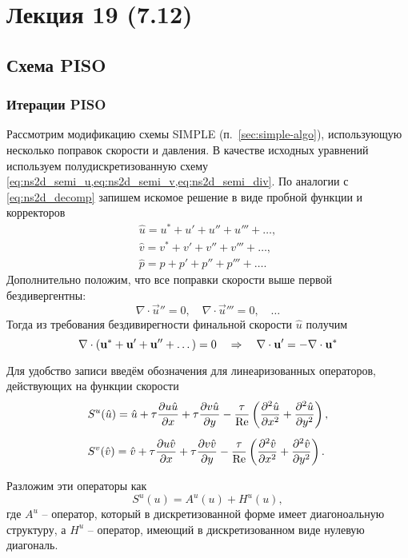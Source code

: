 \section{Лекция 19 (7.12)}

\subsection{Схема PISO}
\subsubsection{Итерации PISO}
\label{sec:piso}
Рассмотрим модификацию схемы SIMPLE (п.~\ref{sec:simple-algo}), использующую несколько поправок скорости и давления.
В качестве исходных уравнений используем полудискретизованную схему \cref{eq:ns2d_semi_u,eq:ns2d_semi_v,eq:ns2d_semi_div}.
По аналогии с \cref{eq:ns2d_decomp} запишем искомое решение в виде пробной функции и корректоров
\begin{equation}
\label{eq:piso_decomp}
\begin{array}{l}
    \hat u = u^* + u' + u'' + u''' + \dots,\\
    \hat v = v^* + v' + v'' + v''' + \dots,\\
    \hat p = p + p' + p'' + p''' + \dots.
\end{array}
\end{equation}
Дополнительно положим, что все поправки скорости выше первой бездивергентны:
\begin{equation}
\label{eq:piso_div_uprime2}
\nabla\cdot \vec u'' = 0, \quad \nabla\cdot \vec u''' = 0, \quad \dots
\end{equation}
Тогда из требования бездивирегности финальной скорости $\hat u$ получим 
\begin{equation}
\label{eq:piso_div_uprime1}
\nabla \cdot (\boldsymbol{\rm u}^* + \boldsymbol{\rm u}' + \boldsymbol{\rm u}'' + \dots ) = 0 \quad\Rightarrow\quad \nabla \cdot \boldsymbol{\rm u}' = - \nabla \cdot \boldsymbol{\rm u}^*
\end{equation}

Для удобство записи введём обозначения для линеаризованных операторов, действующих на функции скорости
\begin{equation}
\label{eq:piso_s}
\begin{aligned}
&S^u(\hat u) = \hat u + \tau\frac{\partial u \hat u}{\partial x} + \tau\frac{\partial v \hat u}{\partial y} - \frac{\tau}{\mathrm{Re}}\left(\frac{\partial^2 \hat u}{\partial x^2} + \frac{\partial^2 \hat u}{\partial y^2}\right),\\[5pt]
&S^v(\hat v) = \hat v + \tau\frac{\partial u \hat v}{\partial x} + \tau\frac{\partial v \hat v}{\partial y} - \frac{\tau}{\mathrm{Re}}\left(\frac{\partial^2 \hat v}{\partial x^2} + \frac{\partial^2 \hat v}{\partial y^2}\right).\\[5pt]
\end{aligned}
\end{equation}
Разложим эти операторы как
\begin{equation*}
S^u(u) = A^u(u) + H^u(u),
\end{equation*}
где $A^u$ -- оператор, который в дискретизованной форме имеет диагоноальную структуру, а $H^u$ -- оператор, имеющий в дискретизованном виде нулевую диагональ.

